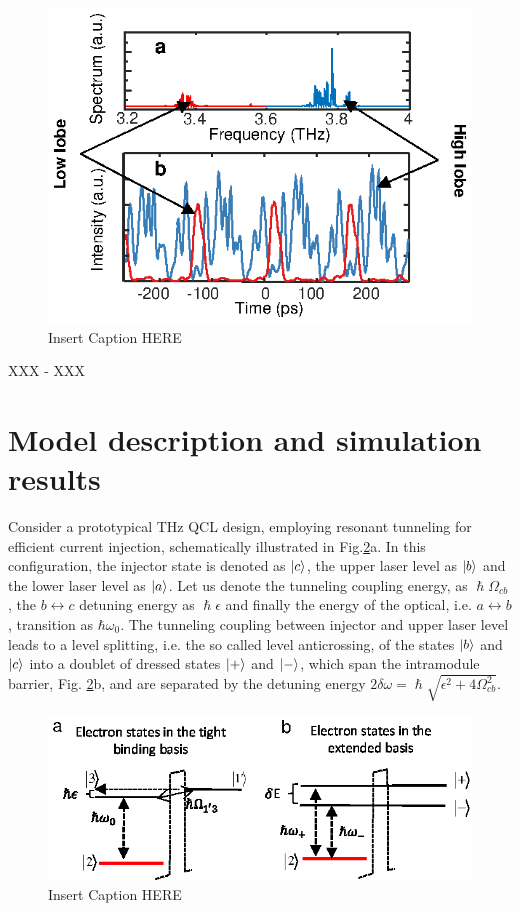 \documentclass[journal]{IEEEtran}
\begin{document}
\begin{figure}[h!]
	\begin{center}
		\includegraphics[scale=1.0]{IMGS/THB_experiment.eps}
		\caption{ Insert Caption HERE} \label{fig:img01}
	\end{center}	
\end{figure}
XXX - XXX 

\section{Model description and simulation results}
Consider a prototypical THz QCL design, employing resonant tunneling for efficient current injection, schematically illustrated in Fig.\ref{fig:img02}a. In this configuration, the injector state is denoted as $\ket{c}$, the upper laser level as $\ket{b}$ and the lower laser level as $\ket{a}$. Let us denote the tunneling coupling energy, as $\hslash\Omega_{cb}$, the $b\leftrightarrow c$ detuning energy as $\hslash\epsilon$ and finally the energy of the optical, i.e. $a\leftrightarrow b$, transition as $\hbar \omega_0$. The tunneling coupling between injector and upper laser level leads to a level splitting, i.e. the so called level anticrossing, of the states $\ket{b}$ and $\ket{c}$ into a doublet of dressed states $\ket{+}$ and $\ket{-}$, which span the intramodule barrier, Fig. \ref{fig:img02}b, and are separated by the detuning energy $2\delta\omega = \hslash\sqrt{\epsilon^2 + 4\Omega_{cb}^2}$.  

\begin{figure}[h!]
	\begin{center}
		\includegraphics[scale=1.0]{IMGS/basis_compare.eps}
		\caption{ Insert Caption HERE} \label{fig:img02}
	\end{center}	
\end{figure}
\end{document}
